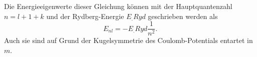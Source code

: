 Die Energieeigenwerte dieser Gleichung können mit der Hauptquantenzahl
$n=l+1+k$ und der Rydberg-Energie $E_.{Ryd}$ geschrieben werden als
\[
E_{n l}=-E_.{Ryd}\frac{1}{n^2}\text{.}
\]
Auch sie sind auf Grund der Kugelsymmetrie des Coulomb-Potentials entartet in $m$.

